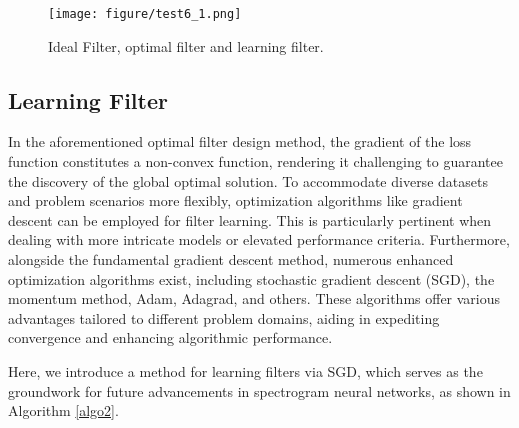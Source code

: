 \documentclass[lettersize,journal]{IEEEtran}
\begin{document}
\begin{figure}
	\centering
	\texttt{[image: figure/test6\_1.png]}
	\caption{Ideal Filter, optimal filter and learning filter. }\label{fig10}
\end{figure}

\subsection{Learning Filter}
In the aforementioned optimal filter design method, the gradient of the loss function constitutes a non-convex function, rendering it challenging to guarantee the discovery of the global optimal solution.
To accommodate diverse datasets and problem scenarios more flexibly, optimization algorithms like gradient descent can be employed for filter learning. This is particularly pertinent when dealing with more intricate models or elevated performance criteria. 
Furthermore, alongside the fundamental gradient descent method, numerous enhanced optimization algorithms exist, including stochastic gradient descent (SGD), the momentum method, Adam, Adagrad, and others. These algorithms offer various advantages tailored to different problem domains, aiding in expediting convergence and enhancing algorithmic performance.

Here, we introduce a method for learning filters via SGD, which serves as the groundwork for future advancements in spectrogram neural networks, as shown in Algorithm \ref{algo2}. 
\end{document}
